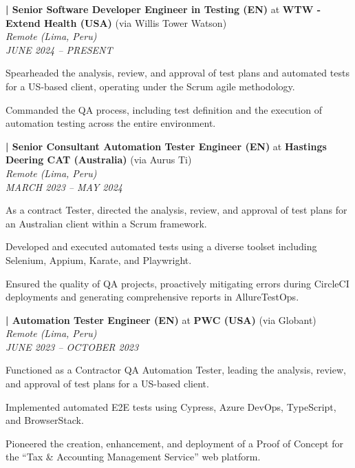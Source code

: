 
\item \label{job:wtw}
\textbf{\thejobcounter | Senior Software Developer Engineer in Testing (EN)} at \textbf{WTW - Extend Health (USA)} (via Willis Tower Watson) \\
\textit{Remote (Lima, Peru)} \\
\textit{JUNE 2024 -- PRESENT}
\resumeItemListStart
    \item Spearheaded the analysis, review, and approval of test plans and automated tests for a US-based client, operating under the Scrum agile methodology.
    \item Commanded the QA process, including test definition and the execution of automation testing across the entire environment.
\resumeItemListEnd

\item \label{job:aurus}
\textbf{\thejobcounter | Senior Consultant Automation Tester Engineer (EN)} at \textbf{Hastings Deering CAT (Australia)} (via Aurus Ti) \\
\textit{Remote (Lima, Peru)} \\
\textit{MARCH 2023 -- MAY 2024}
\resumeItemListStart
    \item As a contract Tester, directed the analysis, review, and approval of test plans for an Australian client within a Scrum framework.
    \item Developed and executed automated tests using a diverse toolset including Selenium, Appium, Karate, and Playwright.
    \item Ensured the quality of QA projects, proactively mitigating errors during CircleCI deployments and generating comprehensive reports in AllureTestOps.
\resumeItemListEnd

\item \label{job:globant}
\textbf{\thejobcounter | Automation Tester Engineer (EN)} at \textbf{PWC (USA)} (via Globant) \\
\textit{Remote (Lima, Peru)} \\
\textit{JUNE 2023 -- OCTOBER 2023}
\resumeItemListStart
    \item Functioned as a Contractor QA Automation Tester, leading the analysis, review, and approval of test plans for a US-based client.
    \item Implemented automated E2E tests using Cypress, Azure DevOps, TypeScript, and BrowserStack.
    \item Pioneered the creation, enhancement, and deployment of a Proof of Concept for the ``Tax \& Accounting Management Service'' web platform.
\resumeItemListEnd

